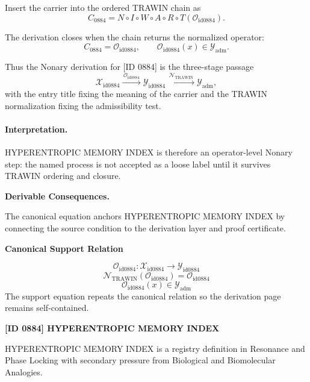 Insert the carrier into the ordered TRAWIN chain as\[
C_{0884}=N\circ I\circ W\circ A\circ R\circ T(\mathcal{O}_{\mathrm{id0884}}).
\]

The derivation closes when the chain returns the normalized operator:\[
C_{0884}=\mathcal{O}_{\mathrm{id0884}},\qquad \mathcal{O}_{\mathrm{id0884}}(x)\in\mathcal{Y}_{\mathrm{adm}}.
\]

Thus the Nonary derivation for [ID 0884] is the three-stage passage
\[
\mathcal{X}_{\mathrm{id0884}}\xrightarrow{\,\mathcal{O}_{\mathrm{id0884}}\,} \mathcal{Y}_{\mathrm{id0884}}\xrightarrow{\,\mathcal{N}_{\mathrm{TRAWIN}}\,} \mathcal{Y}_{\mathrm{adm}},
\]
with the entry title fixing the meaning of the carrier and the TRAWIN normalization fixing the admissibility test.

\paragraph{Interpretation.} HYPERENTROPIC MEMORY INDEX is therefore an operator-level Nonary step: the named process is not accepted as a loose label until it survives TRAWIN ordering and closure.

\par\vspace{0.35em}
\noindent\textbf{Derivable Consequences.}\quad
\begingroup
\footnotesize
\raggedright
The canonical equation anchors HYPERENTROPIC MEMORY INDEX by connecting the source condition to the derivation layer and proof certificate.
\par\endgroup

\noindent\textbf{Canonical Support Relation}\par
\[
\mathcal{O}_{\mathrm{id0884}}:\mathcal{X}_{\mathrm{id0884}}\longrightarrow\mathcal{Y}_{\mathrm{id0884}}
\]
\[
\mathcal{N}_{\mathrm{TRAWIN}}(\mathcal{O}_{\mathrm{id0884}})=\mathcal{O}_{\mathrm{id0884}}
\]
\[
\mathcal{O}_{\mathrm{id0884}}(x)\in\mathcal{Y}_{\mathrm{adm}}
\]
\noindent The support equation repeats the canonical relation so the derivation page remains self-contained.\par

\clearpage
\noindent\textbf{[ID 0884] HYPERENTROPIC MEMORY INDEX}\par
\vspace{0.35em}
\begingroup\small
{}
HYPERENTROPIC MEMORY INDEX is a registry definition in Resonance and Phase Locking with secondary pressure from Biological and Biomolecular Analogies.


